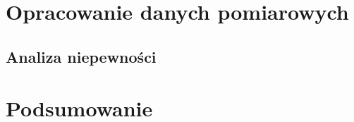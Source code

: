 \documentclass[a4paper,12pts]{article}
\begin{document}
	
	\section{Opracowanie danych pomiarowych}
	
	
	\subsection{Analiza niepewności}
	

	\section{Podsumowanie}

\end{document}
